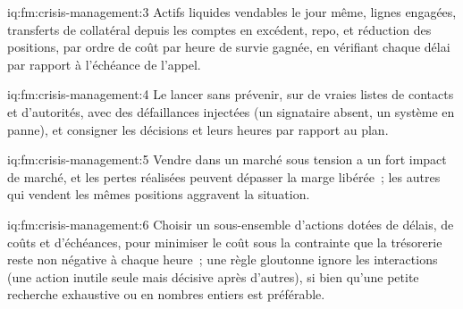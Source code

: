 \begin{solution}{iq:fm:crisis-management:3}
Actifs liquides vendables le jour même, lignes engagées, transferts de collatéral depuis les comptes en excédent, repo, et réduction des positions, par
ordre de coût par heure de survie gagnée, en vérifiant chaque délai par rapport à l'échéance de l'appel.
\end{solution}

\begin{solution}{iq:fm:crisis-management:4}
Le lancer sans prévenir, sur de vraies listes de contacts et d'autorités, avec des défaillances injectées (un signataire absent, un système en panne), et consigner les décisions et
leurs heures par rapport au plan.
\end{solution}

\begin{solution}{iq:fm:crisis-management:5}
Vendre dans un marché sous tension a un fort impact de marché, et les pertes réalisées peuvent dépasser la marge libérée~; les autres qui vendent les mêmes positions aggravent
la situation.
\end{solution}

\begin{solution}{iq:fm:crisis-management:6}
Choisir un sous-ensemble d'actions dotées de délais, de coûts et d'échéances, pour minimiser le coût sous la contrainte que la trésorerie reste non négative à chaque heure~; une règle gloutonne ignore
les interactions (une action inutile seule mais décisive après d'autres), si bien qu'une petite recherche exhaustive ou en nombres entiers est préférable.
\end{solution}
